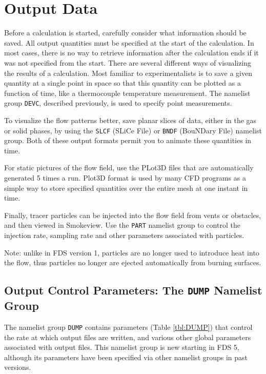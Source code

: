 \documentclass[11pt]{book}
\newcommand{\ct}{\tt\small}
\begin{document}
\chapter{Output Data}
\label{info:outputdata}
Before a calculation is started, carefully consider
what information should be saved. All output quantities must be specified
at the start of the calculation. In most cases, there is no way to
retrieve information after the calculation ends if it was not specified from the start.
There are several different ways of visualizing the results of a
calculation. Most familiar to
experimentalists is to save a given quantity at a single point in space so
that this quantity can be plotted as a function of time, like a
thermocouple temperature measurement. The namelist group {\ct DEVC},
described previously, is used to specify point measurements.

To visualize the flow patterns better, save planar
slices of data, either in the gas or solid phases, by using the
{\ct SLCF} (SLiCe File) or {\ct BNDF} (BouNDary File) namelist group.
Both of these output formats permit you to animate these quantities in
time.

For static pictures of the flow field, use the PLot3D files
that are automatically generated 5 times a run. Plot3D format is used by many CFD programs as a simple
way to store specified quantities over the entire mesh at one instant in
time.

Finally, tracer particles can be injected into the flow field from
vents or obstacles, and then viewed in Smokeview. Use the {\ct PART}
namelist group to control the injection rate, sampling rate and other
parameters associated with particles.

\begin{warning}
\noindent
Note: unlike in FDS version 1,
particles are no longer used to introduce heat into the flow, thus
particles no longer are ejected automatically from burning surfaces.
\end{warning}


\section{Output Control Parameters: The \texorpdfstring{{\tt DUMP}}{DUMP} Namelist Group}
\label{info:DUMP}

The namelist group {\ct DUMP} contains parameters (Table \ref{tbl:DUMP}) that control the rate at which output files
are written, and various other global parameters associated with output files.
This namelist group is new starting in FDS 5, although its
parameters have been specified via other namelist groups in past versions.
\end{document}
